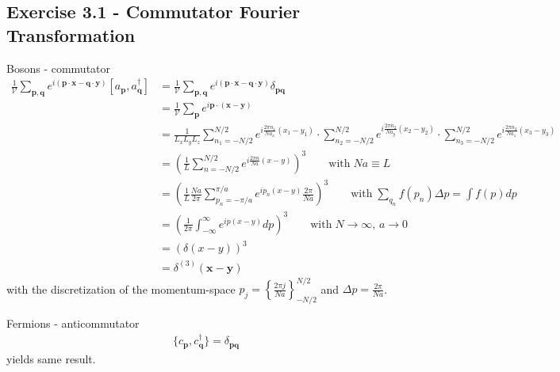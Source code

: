 \documentclass[../main.tex]{subfiles}
\begin{document}
\subsection*{Exercise 3.1 - Commutator Fourier Transformation}
Bosons - commutator
\begin{align}
\frac{1}{\mathcal{V}}\sum_{\mathbf{p,q}}e^{i(\mathbf{p}\cdot\mathbf{x}-\mathbf{q}\cdot\mathbf{y})}[a_\mathbf{p},a^\dagger_\mathbf{q}]
&=\frac{1}{\mathcal{V}}\sum_{\mathbf{p,q}}e^{i(\mathbf{p}\cdot\mathbf{x}-\mathbf{q}\cdot\mathbf{y})}\delta_{\mathbf{pq}}\\
&=\frac{1}{\mathcal{V}}\sum_{\mathbf{p}}e^{i\mathbf{p}\cdot(\mathbf{x}-\mathbf{y})}\\
&=\frac{1}{L_xL_yL_z}\sum_{n_1=-N/2}^{N/2}e^{i\frac{2\pi n_1}{Na_x}(x_1-y_1)}\cdot\sum_{n_2=-N/2}^{N/2}e^{i\frac{2\pi n_2}{Na_y}(x_2-y_2)}\cdot\sum_{n_3=-N/2}^{N/2}e^{i\frac{2\pi n_3}{Na_z}(x_3-y_3)}\\
&=\left(\frac{1}{L}\sum_{n=-N/2}^{N/2}e^{i\frac{2\pi n}{Na}(x-y)}\right)^3\qquad\text{with}\;Na\equiv L\\
&=\left(\frac{1}{L}\frac{Na}{2\pi}\sum_{p_n=-\pi/a}^{\pi/a}e^{ip_n(x-y)}\frac{2\pi}{Na}\right)^3\qquad\text{with}\;\sum_{q_n}f(p_n)\Delta p=\int f(p)dp\\
&=\left(\frac{1}{2\pi}\int_{-\infty}^{\infty}e^{ip(x-y)}dp\right)^3\qquad\text{with}\;N\rightarrow\infty,\,a\rightarrow0\\
&=\left(\delta(x-y)\right)^3\\
&=\delta^{(3)}(\mathbf{x}-\mathbf{y})
\end{align}
with the discretization of the momentum-space $p_j=\left\{\frac{2\pi j}{Na}\right\}_{-N/2}^{N/2}$ and $\Delta p=\frac{2\pi}{Na}$.

Fermions - anticommutator
\begin{align}
\{c_\mathbf{p},c^\dagger_\mathbf{q}\}=\delta_{\mathbf{p}\mathbf{q}}
\end{align}
yields same result.
\end{document}
